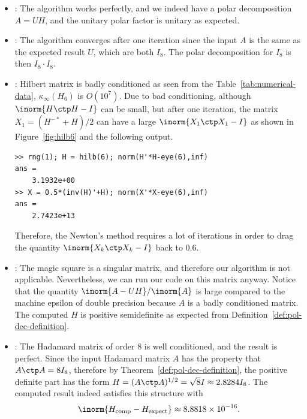 \documentclass{article}
\numberwithin{equation}{section} %
\begin{document}
\begin{itemize}
\item {}: The algorithm works perfectly, and we indeed have
a polar decomposition $A = UH$, and the unitary polar factor is unitary as
expected.
\item {}: The algorithm converges after one iteration since
the input $A$ is the same as the expected result $U$, which are both $I_8$.
The polar decomposition for $I_8$ is then $I_8 \cdot I_8$.
\item {}: Hilbert matrix is badly conditioned as seen from
the Table~\ref{tab:numerical-data}, $\kappa_\infty(H_6)$ is $O(10^7)$. Due
to bad conditioning, although $\inorm{H\ctp H - I}$ can be small, but after
one iteration, the matrix $X_{1} = (H^{-*} + H)/2$ can have a large
$\inorm{X_1\ctp X_1 - I}$ as shown in Figure~\ref{fig:hilb6} and the
following output.
\begin{lstlisting}[numbers=none]
>> rng(1); H = hilb(6); norm(H'*H-eye(6),inf)
ans =
    3.1932e+00
>> X = 0.5*(inv(H)'+H); norm(X'*X-eye(6),inf)
ans =
    2.7423e+13
\end{lstlisting}
    
Therefore, the Newton's method requires a lot of iterations in order to
drag the quantity $\inorm{X_k\ctp X_k - I}$ back to $0.6$.
\item {}: The magic square is a singular matrix, and
therefore our algorithm is not applicable. Nevertheless, we can run our
code on this matrix anyway. Notice that the quantity
$\inorm{A-UH}/\inorm{A}$ is large compared to the machine epsilon of double
precision because $A$ is a badly conditioned matrix. The computed $H$ is
positive semidefinite as expected from
Definition~\ref{def:pol-dec-definition}.
\item {}: The Hadamard matrix of order 8 is well
conditioned, and the result is perfect. Since the input Hadamard matrix $A$
has the property that $A\ctp A = 8I_8$, therefore by
Theorem~\ref{def:pol-dec-definition}, the positive definite part has the
form $H = (A\ctp A)^{1/2} = \sqrt{8}I \approx 2.8284I_8$. The computed
result indeed satisfies this structure with
$$\inorm{H_\mathrm{comp} - H_\mathrm{expect}}\approx 8.8818\times
10^{-16}.$$
\end{itemize}
\end{document}
